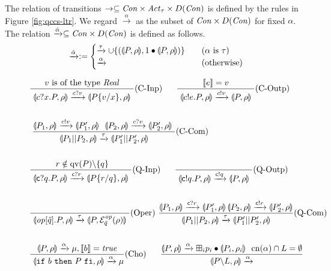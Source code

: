 \begin{defi}
The relation of transitions $\rightarrow \subseteq \mathit{Con} \times
\mathit{Act}_\tau \times D(\mathit{Con})$
is defined by the rules in Figure \ref{fig:qccs-ltr}.
We regard $\xrightarrow{\alpha}$ as the subset of
$\mathit{Con} \times D(\mathit{Con})$ for fixed $\alpha$.
The relation $\xrightarrow{\hat \alpha} \subseteq \mathit{Con} \times D(\mathit{Con})$
is defined as follows.
\[
 \xrightarrow{\hat \alpha} := \begin{cases}
			       \xrightarrow{\tau} \cup \{(\llparenthesis P, \rho \rrparenthesis,
			       1\bullet
			       \llparenthesis P, \rho \rrparenthesis)\}~~~&(\alpha
			       \mbox{ is } \tau)\\
			       \xrightarrow{\alpha}~~~&(\mbox{otherwise})
			      \end{cases} 
\]
\end{defi}
\begin{figure}
\begin{align*}
&\frac{ v \mbox{ is of the type } \mathit{Real}
}
{
~\llparenthesis c?x.P, \rho \rrparenthesis \xrightarrow{c?v}
 \llparenthesis P\{v/x\}, \rho \rrparenthesis~
}(\mbox{C-Inp})~~~~~
\frac{
 [\![e]\!] = v
}
{
~\llparenthesis c!e.P, \rho \rrparenthesis \xrightarrow{c!v}
 \llparenthesis P, \rho \rrparenthesis~
}(\mbox{C-Outp})\\
\\
&~\frac{\llparenthesis P_1, \rho \rrparenthesis \xrightarrow{c!v} \llparenthesis P_1', \rho \rrparenthesis~~
\llparenthesis P_2, \rho \rrparenthesis \xrightarrow{c?v} \llparenthesis P_2', \rho \rrparenthesis~
}
{
\llparenthesis P_1||P_2, \rho \rrparenthesis \xrightarrow{\tau} \llparenthesis P_1'||P_2', \rho \rrparenthesis
}(\mbox{C-Com})
\\
\\
&\frac{
~r \notin \mathrm{qv}(P)\backslash{\{q\}}
}
{
~\llparenthesis \mathsf{c}? q.P, \rho \rrparenthesis \xrightarrow{\mathsf{c}? r}
 \llparenthesis P\{r/q\}, \rho \rrparenthesis~
}(\mbox{Q-Inp})~~~~~
\frac{
}
{
~\llparenthesis \mathsf{c}! q.P, \rho \rrparenthesis \xrightarrow{\mathsf{c}! q}
 \llparenthesis P, \rho \rrparenthesis~
}(\mbox{Q-Outp})
\\
\\
&\frac{
}
{
~\llparenthesis \mathit{op}[\tilde q].P, \rho \rrparenthesis \xrightarrow{\tau}
 \llparenthesis P, \mathcal{E}^{\mathit{op}}_{\tilde q}(\rho) \rrparenthesis~
}(\mbox{Oper})~
\frac{
\llparenthesis P_1, \rho \rrparenthesis \xrightarrow{\mathsf{c}? r} \llparenthesis P'_1, \rho \rrparenthesis\,
\llparenthesis P_2, \rho \rrparenthesis \xrightarrow{\mathsf{c}! r}
 \llparenthesis P'_2, \rho \rrparenthesis
}
{
\llparenthesis P_1||P_2, \rho \rrparenthesis \xrightarrow{\tau}
 \llparenthesis P'_1||P'_2, \rho \rrparenthesis
}(\mbox{Q-Com})
\\
\\
&\frac{
\llparenthesis P, \rho \rrparenthesis \xrightarrow{\alpha} \mu,
[\![b]\!] = \mathit{true}
}
{
~\llparenthesis \mathtt{if}~b~\mathtt{then}~P~\mathtt{fi}, \rho \rrparenthesis \xrightarrow{\alpha} \mu
}(\mbox{Cho})
~~~~~
\frac{\llparenthesis P, \rho \rrparenthesis \xrightarrow{\alpha}
 \boxplus_i p_i \bullet \llparenthesis P_i, \rho_i \rrparenthesis
~~\mathrm{cn}(\alpha) \cap
 L = \emptyset}
{\llparenthesis P \backslash L, \rho \rrparenthesis \xrightarrow{\alpha} 
}
\end{align*}
\end{figure}
